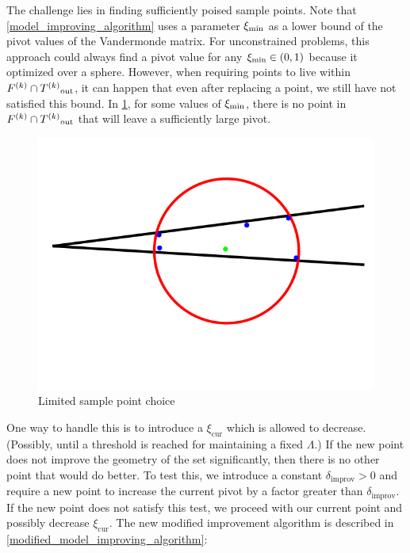 The challenge lies in finding sufficiently poised sample points.
Note that \cref{model_improving_algorithm} uses a parameter $  \xi_{\text{min}} $ as a lower bound of the pivot values of the Vandermonde matrix.
For unconstrained problems, this approach could always find a pivot value for any $ \xi_{\text{min}} \in (0,1)$ because it optimized over a sphere.
However, when requiring points to live within $ {F}^{(k)} \cap {T^{(k)}}_{\text{out}} $, it can happen that even after replacing a point, we still have not satisfied this bound.
In \cref{lspc}, for some values of $  \xi_{\text{min}} $, there is no point in $ {F}^{(k)} \cap {T^{(k)}}_{\text{out}} $ that will leave a sufficiently large pivot.

\begin{figure}[h]
    \centering
    \includegraphics[scale=0.4]{images/bad_lambda.png}
    \caption{Limited sample point choice}
    \label{lspc}
\end{figure}


One way to handle this is to introduce a $\xi_{\text{cur}}$ which is allowed to decrease.
(Possibly, until a threshold is reached for maintaining a fixed $\Lambda$.)
If the new point does not improve the geometry of the set significantly, then there is no other point that would do better.
To test this, we introduce a constant $\delta_{\text{improv}}>0$ and require a new point to increase the current pivot by a factor greater than $\delta_{\text{improv}}$.
If the new point does not satisfy this test, we proceed with our current point and possibly decrease $\xi_{\text{cur}}$.
The new modified improvement algorithm is described in \cref{modified_model_improving_algorithm}:

